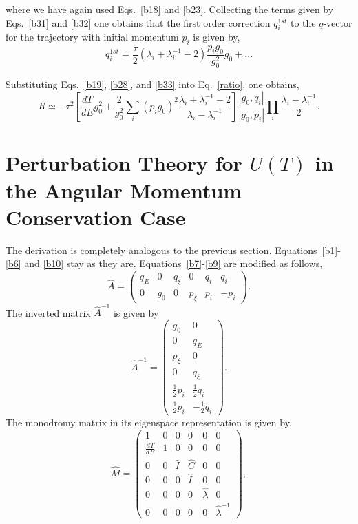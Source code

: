\documentclass[journal=jpcafh,manuscript=article]{achemso}
\begin{document}
where we have again used  Eqs.~\ref{b18} and \ref{b23}. Collecting
the terms given by Eqs.~\ref{b31} and \ref{b32} one obtains that the first
order correction $q^{1st}_i$ to  the $q$-vector for the trajectory with
initial momentum $p_i$ is given by,
\begin{equation}
  \label{b33}
  q^{1st}_i=\frac{\tau}{2}(\lambda_i+\lambda_i^{-1}-2)\frac{p_ig_0}{g_0^2}g_0+...
\end{equation}

Substituting Eqs.~\ref{b19}, \ref{b28}, and \ref{b33} into
Eq.~\ref{ratio}, one obtains,
\begin{equation}
  \label{b34}
  R\simeq-\tau^2\left[\frac{dT}{dE}g_0^2+\frac{2}{g_0^2}\sum_i (p_ig_0)^2
    \frac{\lambda_i+\lambda_i^{-1} -
      2}{\lambda_i-\lambda_i^{-1}}\right]
  \frac{|g_0,q_i|}{|g_0,p_i|}\prod_i\frac{\lambda_i-\lambda_i^{-1}}{2}.
\end{equation}

\setcounter{equation}{0}
\section{Perturbation Theory for $U(T)$ in the Angular
  Momentum Conservation Case}
The derivation is completely analogous to the previous
section. Equations~\ref{b1}-\ref{b6} and \ref{b10} stay as they
are. Equations~\ref{b7}-\ref{b9} are modified as follows,
\begin{equation}
  \label{c7}
  \hat{A}=\left(\begin{array}{cccccc}q_E&0&q_\xi&0&q_i&q_i\\0&g_0&0&p_\xi&p_i&-p_i\end{array}\right).
\end{equation}
The inverted matrix $\hat{A}^{-1}$ is given by
\begin{equation}
  \label{c8}
  \hat{A}^{-1}=\left(\begin{array}{cc}g_0&0\\0&q_E\\p_\xi&0\\0&q_\xi
                       \\\frac{1}{2}p_i&\frac{1}{2}q_i\\\frac{1}{2}p_i&-\frac{1}{2}q_i\end{array}\right).
\end{equation}
The monodromy matrix in its eigenspace representation is given by,
\begin{equation}
  \label{c10}
  \hat{M}=\left(\begin{array}{cccccc}
                     1                 &0&0&0&0&0
                  \\\frac{dT}{dE}&1&0&0&0&0
                  \\ 0                &0&\hat{I}&\hat{C}&0&0
                  \\ 0                &0&0&\hat{I}&0&0
                  \\ 0&0&0&0&\hat{\lambda}&0
                  \\ 0&0&0&0&0&\hat{\lambda}^{-1}
                \end{array}\right),
\end{equation}
\end{document}
